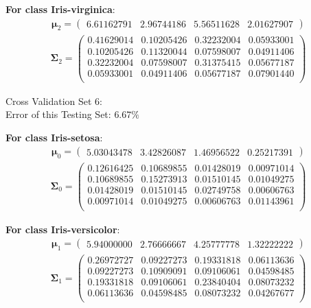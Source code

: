\documentclass[11pt,a4paper]{article}
\newcommand{\htab}{\hspace*{0.63cm}}
\newcommand{\bs}[1]{\boldsymbol{#1}}
\begin{document}
\textbf{For class Iris-virginica}:
\begin{align} \bs{\mu}_{2} = \begin{pmatrix} 
6.61162791 & 2.96744186 & 5.56511628 & 2.01627907 
 \end{pmatrix}  \end{align} 
\vspace{-1cm}
\begin{align} \bs{\Sigma}_{2} = \begin{pmatrix} 
0.41629014 & 0.10205426 & 0.32232004 & 0.05933001 \\ 
0.10205426 & 0.11320044 & 0.07598007 & 0.04911406 \\ 
0.32232004 & 0.07598007 & 0.31375415 & 0.05677187 \\ 
0.05933001 & 0.04911406 & 0.05677187 & 0.07901440 \\ 
\end{pmatrix} \end{align}


Cross Validation Set 6: \\
\htab Error of this Testing Set: $6.67\%$ 

\textbf{For class Iris-setosa}:
\begin{align} \bs{\mu}_{0} = \begin{pmatrix} 
5.03043478 & 3.42826087 & 1.46956522 & 0.25217391 
 \end{pmatrix}  \end{align} 
\vspace{-1cm}
\begin{align} \bs{\Sigma}_{0} = \begin{pmatrix} 
0.12616425 & 0.10689855 & 0.01428019 & 0.00971014 \\ 
0.10689855 & 0.15273913 & 0.01510145 & 0.01049275 \\ 
0.01428019 & 0.01510145 & 0.02749758 & 0.00606763 \\ 
0.00971014 & 0.01049275 & 0.00606763 & 0.01143961 \\ 
\end{pmatrix} \end{align}

\textbf{For class Iris-versicolor}:
\begin{align} \bs{\mu}_{1} = \begin{pmatrix} 
5.94000000 & 2.76666667 & 4.25777778 & 1.32222222 
 \end{pmatrix}  \end{align} 
\vspace{-1cm}
\begin{align} \bs{\Sigma}_{1} = \begin{pmatrix} 
0.26972727 & 0.09227273 & 0.19331818 & 0.06113636 \\ 
0.09227273 & 0.10909091 & 0.09106061 & 0.04598485 \\ 
0.19331818 & 0.09106061 & 0.23840404 & 0.08073232 \\ 
0.06113636 & 0.04598485 & 0.08073232 & 0.04267677 \\ 
\end{pmatrix} \end{align}
\end{document}
